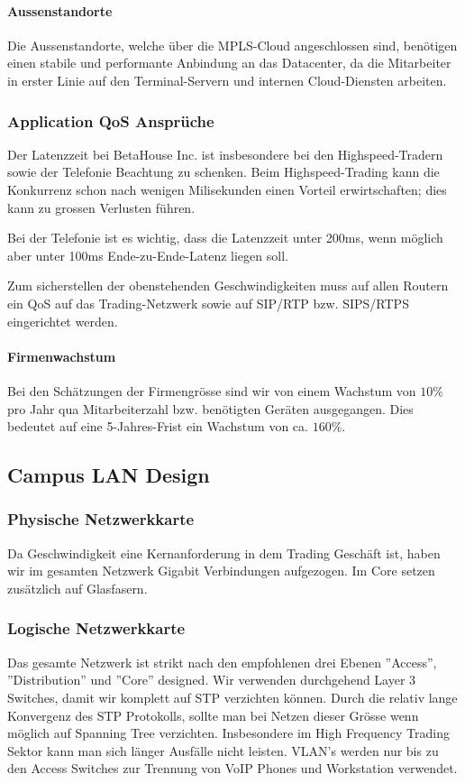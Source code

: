\paragraph{Aussenstandorte}

Die Aussenstandorte, welche über die MPLS-Cloud angeschlossen sind, benötigen einen stabile und performante Anbindung an das Datacenter, da die Mitarbeiter in erster Linie auf den Terminal-Servern und internen Cloud-Diensten arbeiten.

\subsubsection{Application QoS Ansprüche}

Der Latenzzeit bei BetaHouse Inc. ist insbesondere bei den Highspeed-Tradern sowie der Telefonie Beachtung zu schenken. Beim Highspeed-Trading kann die Konkurrenz schon nach wenigen Milisekunden einen Vorteil erwirtschaften; dies kann zu grossen Verlusten führen.

Bei der Telefonie ist es wichtig, dass die Latenzzeit unter 200ms, wenn möglich aber unter 100ms Ende-zu-Ende-Latenz liegen soll.

Zum sicherstellen der obenstehenden Geschwindigkeiten muss auf allen Routern ein QoS auf das Trading-Netzwerk sowie auf SIP/RTP bzw. SIPS/RTPS eingerichtet werden.


\paragraph{Firmenwachstum}
Bei den Schätzungen der Firmengrösse sind wir von einem Wachstum von $10\%$ pro Jahr qua Mitarbeiterzahl bzw. benötigten Geräten ausgegangen. Dies bedeutet auf eine 5-Jahres-Frist ein Wachstum von ca. $160\%$. 

\subsection{Campus LAN Design}

\subsubsection{Physische Netzwerkkarte}
Da Geschwindigkeit eine Kernanforderung in dem Trading Geschäft ist, haben wir im gesamten Netzwerk Gigabit Verbindungen aufgezogen. Im Core setzen zusätzlich auf Glasfasern.

\subsubsection{Logische Netzwerkkarte}
Das gesamte Netzwerk ist strikt nach den empfohlenen drei Ebenen ''Access'', ''Distribution'' und ''Core'' designed. Wir verwenden durchgehend Layer 3 Switches, damit wir komplett auf STP verzichten können. Durch die relativ lange Konvergenz des STP Protokolls, sollte man bei Netzen dieser Grösse wenn möglich auf Spanning Tree verzichten. Insbesondere im High Frequency Trading Sektor kann man sich länger Ausfälle nicht leisten. VLAN's werden nur bis zu den Access Switches zur Trennung von VoIP Phones und Workstation verwendet.

